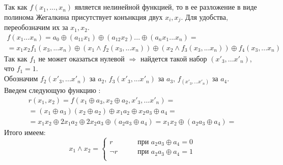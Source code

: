 \documentclass[11pt,a4paper]{scrartcl}
\begin{document}
 \\ \\
Так как $ f(x_1, ..., x_n) $ является нелинейной функцией, то в ее разложение в виде полинома Жегалкина присутствует конънкция  двух $ x_i, x_j $. Для удобства, переобозначим  их за $ x_1, x_2 $.
\begin{gather*}
	f(x_1 ... x_n) = a_0 \oplus (a_{11} x_1) \oplus (a_{12} x_2) ... \oplus (a_n x_1 ... x_n) = \\ =  x_1x_2 f_1(x_3, ... x_n) \oplus (x_1 \land f_2(x_3, ... x_n)) \oplus (x_2 \land f_3(x_3, ... x_n)) \oplus f_4(x_3, ... x_n)
\end{gather*}
Так как $ f_1 $ не может оказаться нулевой $ \Rightarrow $ найдется такой набор $ (x'_3, ... x'_n) $, что $ f_1 = 1$. \\
Обозначим  $ f_2(x'_3, ... x'_n) $ за $ a_2 $,  $ f_3(x'_3, ... x'_n) $ за $ a_3 $, $ f_(x'_3, ... x'_n) $ за $ a_4 $. \\
Введем следующую функцию :
\begin{gather*}
	r(x_1, x_2) = f(x_1 \oplus a_3, x_2 \oplus a_2, x'_3, ... x'_n) = \\
	=  (x_1 \oplus a_3)(x_2 \oplus a_2) \oplus x_1 a_2 \oplus x_2 a_3 \oplus a_4 = \\
	= x_1x_2 \oplus 2x_1a_2 \oplus 2x_2a_3 \oplus (a_2a_3 \oplus a_4) =
	x_1x_2 \oplus (a_2a_3 \oplus a_4) =  
\end{gather*} 
Итого имеем:
\[	
	x_1 \land x_2 = 
	\begin{cases}
		r \qquad &\textit{при } a_2a_3 \oplus a_4 = 0 	\\
		\neg r \qquad &\textit{при } a_2a_3 \oplus a_4 = 1 	\\
	\end{cases}
\]
 
\end{document}
